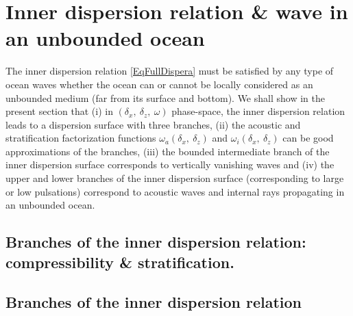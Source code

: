 \documentclass[a4paper,11pt]{article}
\begin{document}
\section{Inner dispersion relation \& wave in an unbounded ocean}

The inner dispersion relation \ref{EqFullDispera} must be satisfied by any type of ocean waves whether the ocean can or cannot be locally considered as an unbounded medium (far from its surface and bottom). We shall show in the present section that (i) in $(\delta_x,\  \delta_z,\ \omega)$ phase-space, the inner dispersion relation leads to a dispersion surface with three branches, (ii) the acoustic and stratification factorization functions $\omega_a(\delta_x,\ \delta_z)$ and $\omega_i(\delta_x,\ \delta_z)$ can be good approximations of the branches, (iii) the bounded intermediate branch of the inner dispersion surface corresponds to vertically vanishing waves and (iv) the upper and lower branches of the inner dispersion surface (corresponding to large or low pulsations) correspond to acoustic waves and internal rays propagating in an unbounded ocean.


\subsection{Branches of the inner dispersion relation: compressibility \& stratification.}
\subsection{}
\subsection{Branches of the inner dispersion relation}
\end{document}
